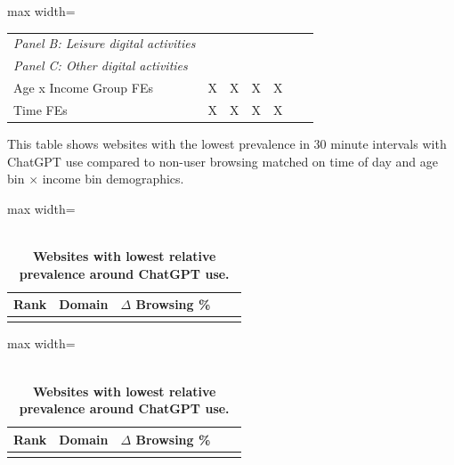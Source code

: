 \documentclass[12pt]{article}
\begin{document}
\begin{table}[htbp]
\begin{adjustbox}{max width=\textwidth}
\begin{tabular}{@{}l*{6}{c}@{}}
                     
\midrule
\emph{Panel B: Leisure digital activities}  &&&& \\
\addlinespace
                   
                     
\midrule
\emph{Panel C: Other digital activities}  &&&& \\
\addlinespace
                   
                     
\midrule
	Age x Income Group FEs & X & X	 & X & X    \\		
	Time FEs & X & X	 & X & X    \\		
    \bottomrule
\end{tabular}
\end{adjustbox}
\end{table}



\begin{table}[htbp]
\caption{\\ \centering \textbf{Websites with lowest relative prevalence around ChatGPT use.}}  

\vspace{-0.1cm} \label{table:bottomsites-gptwindow} \footnotesize  This table shows websites with the {lowest} prevalence in 30 minute intervals with ChatGPT use compared to non-user browsing matched on time of day and age bin $\times$ income bin demographics.

\vspace{0.2cm}

\centering
\begin{adjustbox}{max width=\textwidth}   
\begin{tabular}{@{}l*{4}{c}@{}}
\toprule
Rank & Domain & $\Delta$ Browsing \% \\
\midrule
      \addlinespace
                     
                   \bottomrule
                   \end{tabular}
\end{adjustbox}
\begin{adjustbox}{max width=\textwidth}
\begin{tabular}{@{}l*{4}{c}@{}}
\toprule
Rank & Domain & $\Delta$ Browsing \% \\
\midrule
      \addlinespace
                     
                   \bottomrule
                   \end{tabular}
\end{adjustbox}
\end{table}
\end{document}
